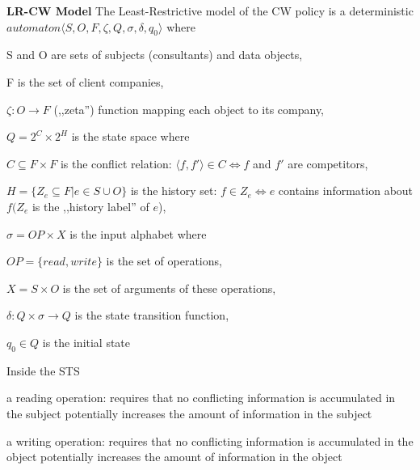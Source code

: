 \documentclass[a4paper]{article}
\renewcommand{\note}[2]{\begin{noteBox} \textbf{#1} #2 \end{noteBox}}
\begin{document}
\begin{multicols}{3}
    \note{LR-CW Model}{The Least-Restrictive model of the CW policy is a deterministic $automaton \langle S,O,F,\zeta,Q,\sigma,\delta,q_0\rangle$ where
        \begin{itemize*}
            \item S and O are sets of subjects (consultants) and data objects,
            \item F is the set of client companies,
            \item $\zeta:O\rightarrow F$ (,,zeta'') function mapping each object to its company,
            \item $Q=2^C \times 2^H$ is the state space where
            \begin{itemize*}
                \item $C\subseteq F\times F$ is the conflict relation: $\langle f,f'\rangle \in C\Leftrightarrow f$ and $f'$ are competitors,
                \item $H=\{Z_e\subseteq F|e\in S\cup O\}$ is the history set: $f\in Z_e\Leftrightarrow e$ contains information about $f(Z_e$ is the ,,history label'' of $e$),
            \end{itemize*}
            \item $\sigma=OP\times X$ is the input alphabet where
            \begin{itemize*}
                \item $OP=\{read,write\}$ is the set of operations,
                \item $X=S\times O$ is the set of arguments of these operations,
            \end{itemize*}
            \item $\delta:Q\times\sigma\rightarrow Q$ is the state transition function,
            \item $q_0\in Q$ is the initial state
        \end{itemize*}
    }

    Inside the STS
    \begin{itemize*}
        \item a reading operation: requires that no conflicting information is accumulated in the subject potentially increases the amount of information in the subject
        \item a writing operation: requires that no conflicting information is accumulated in the object potentially increases the amount of information in the object
    \end{itemize*}


\end{multicols}
\end{document}
